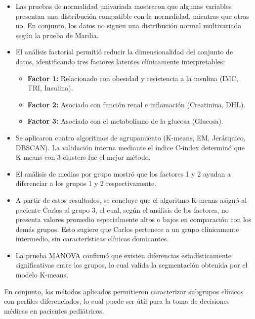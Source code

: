 \documentclass[12pt]{report}
\begin{document}
\begin{itemize}
    \item Las pruebas de normalidad univariada mostraron que algunas variables presentan una distribución compatible con la normalidad, mientras que otras no. En conjunto, los datos no siguen una distribución normal multivariada según la prueba de Mardia.

    \item El análisis factorial permitió reducir la dimensionalidad del conjunto de datos, identificando tres factores latentes clínicamente interpretables:
    \begin{itemize}
        \item \textbf{Factor 1:} Relacionado con obesidad y resistencia a la insulina (IMC, TRI, Insulina).
        \item \textbf{Factor 2:} Asociado con función renal e inflamación (Creatinina, DHL).
        \item \textbf{Factor 3:} Asociado con el metabolismo de la glucosa (Glucosa).
    \end{itemize}

    \item Se aplicaron cuatro algoritmos de agrupamiento (K-means, EM, Jerárquico, DBSCAN). La validación interna mediante el índice C-index determinó que K-means con 3 clusters fue el mejor método.
    



    \item El análisis de medias por grupo mostró que los factores 1 y 2 ayudan a diferenciar a los grupos 1 y 2 respectivamente.
    
    \item A partir de estos resultados, se concluye que el algoritmo K-means asignó al paciente Carlos al grupo 3, el cual, según el análisis de los factores, no presenta valores promedio especialmente altos o bajos en comparación con los demás grupos. Esto sugiere que Carlos pertenece a un grupo clínicamente intermedio, sin características clínicas dominantes.

    \item La prueba MANOVA confirmó que existen diferencias estadísticamente significativas entre los grupos, lo cual valida la segmentación obtenida por el modelo K-means.
\end{itemize}

\noindent En conjunto, los métodos aplicados permitieron caracterizar subgrupos clínicos con perfiles diferenciados, lo cual puede ser útil para la toma de decisiones médicas en pacientes pediátricos.
\end{document}
